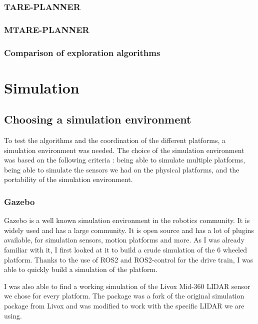 \documentclass[11pt]{article}
\begin{document}
        \subsubsection{TARE-PLANNER}
        \subsubsection{MTARE-PLANNER}
        \subsubsection{Comparison of exploration algorithms}


\newpage
\section{Simulation}
    \subsection{Choosing a simulation environment}

        To test the algorithms and the coordination of the different platforms, a simulation environment was needed. The choice of the simulation environment was based on the following criteria : being able to simulate multiple platforms, being able to simulate the sensors we had on the physical platforms, and the portability of the simulation environment.


        \subsubsection{Gazebo}
            Gazebo is a well known simulation environment in the robotics community. It is widely used and has a large community. It is open source and has a lot of plugins available, for simulation sensors, motion platforms and more. As I was already familiar with it, I first looked at it to build a crude simulation of the 6 wheeled platform. Thanks to the use of ROS2 and ROS2-control for the drive train, I was able to quickly build a simulation of the platform. 

            I was also able to find a working simulation of the Livox Mid-360 LIDAR sensor we chose for every platform. The package \cite{livox_lidar_simulation_fork} was a fork of the original simulation package from Livox \cite{livox_laser_simulation} and was modified to work with the specific LIDAR we are using. 
\end{document}
